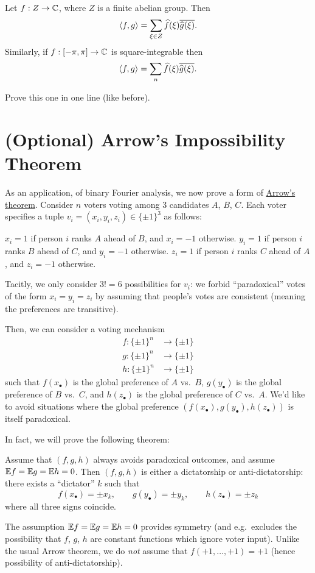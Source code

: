 \begin{corollary}
	Let $f : Z \to \mathbb C$, where $Z$ is a finite abelian group.
	Then \[ \left< f,g \right> = \sum_{\xi \in Z} \widehat f(\xi) \overline{\widehat g(\xi)}. \]
	Similarly, if $f : [-\pi, \pi] \to \mathbb C$ is square-integrable then
	\[ \left< f,g \right> = \sum_n \widehat f(\xi) \overline{\widehat g(\xi)}. \]
\end{corollary}
\begin{ques}
	Prove this one in one line (like before).
\end{ques}

\section{(Optional) Arrow's Impossibility Theorem}
As an application, of binary Fourier analysis,
we now prove a form of
\href{https://en.wikipedia.org/wiki/Arrow's_impossibility_theorem}{Arrow's theorem}.
Consider $n$ voters voting among $3$ candidates $A$, $B$, $C$.
Each voter specifies a tuple $v_i = (x_i, y_i, z_i) \in \{\pm1\}^3$ as follows:
\begin{itemize}
	\ii $x_i = 1$ if person $i$ ranks $A$ ahead of $B$, and $x_i = -1$ otherwise.
	\ii $y_i = 1$ if person $i$ ranks $B$ ahead of $C$, and $y_i = -1$ otherwise.
	\ii $z_i = 1$ if person $i$ ranks $C$ ahead of $A$, and $z_i = -1$ otherwise.
\end{itemize}
Tacitly, we only consider $3! = 6$ possibilities for $v_i$:
we forbid ``paradoxical'' votes of the form $x_i = y_i = z_i$
by assuming that people's votes are consistent
(meaning the preferences are transitive).

Then, we can consider a voting mechanism
\begin{align*}
	f \colon \{\pm1\}^n &\to \{\pm1\} \\
	g \colon \{\pm1\}^n &\to \{\pm1\} \\
	h \colon \{\pm1\}^n &\to \{\pm1\}
\end{align*}
such that $f(x_\bullet)$ is the global preference of $A$ vs.\ $B$,
$g(y_\bullet)$ is the global preference of $B$ vs.\ $C$,
and $h(z_\bullet)$ is the global preference of $C$ vs.\ $A$.
We'd like to avoid situations where the global preference
$(f(x_\bullet), g(y_\bullet), h(z_\bullet))$
is itself paradoxical.

In fact, we will prove the following theorem:
\begin{theorem}
	Assume that $(f,g,h)$ always avoids paradoxical outcomes,
	and assume $\mathbb E f = \mathbb E g = \mathbb E h = 0$.
	Then $(f,g,h)$ is either a dictatorship or anti-dictatorship:
	there exists a ``dictator'' $k$ such that
	\[ f(x_\bullet) = \pm x_k, \qquad g(y_\bullet) = \pm y_k,
		\qquad h(z_\bullet) = \pm z_k \]
	where all three signs coincide.
\end{theorem}
The assumption $\mathbb E f = \mathbb E g = \mathbb E h = 0$ provides symmetry
(and e.g.\ excludes the possibility that $f$, $g$, $h$
are constant functions which ignore voter input).
Unlike the usual Arrow theorem, we do \emph{not} assume
that $f(+1, \dots, +1) = +1$ (hence possibility of anti-dictatorship).

